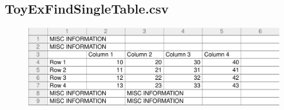 \documentclass[a4paper]{article}
\begin{document}
\newpage
\subsection{ToyExFindSingleTable.csv}
\label{sec:TCRO_ToyExFindSingleTable.csv}
\begin{figure}[!h]
\centering
\includegraphics[width=\textwidth]{./TestCase/ToyExFindSingleTable.pdf}
\end{figure}
\end{document}
